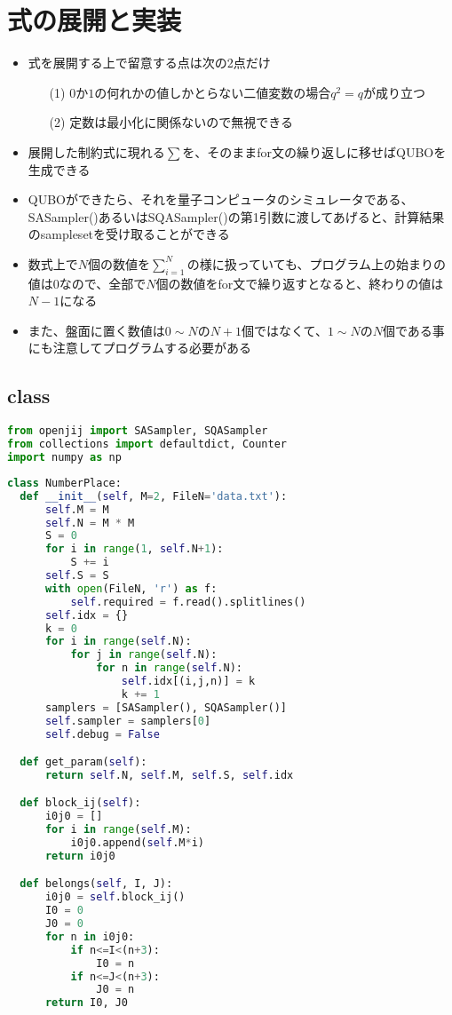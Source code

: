 \documentclass[uplatex,dvipdfmx,a4paper,11pt,oneside,openany]{jsbook}
\begin{document}
\section{式の展開と実装}

\begin{itemize}
\item 式を展開する上で留意する点は次の2点だけ
  \begin{itemize}
  \item[(1)] $0$か$1$の何れかの値しかとらない二値変数の場合$q^2=q$が成り立つ
  \item[(2)] 定数は最小化に関係ないので無視できる
  \end{itemize}
\item 展開した制約式に現れる$\sum$を、そのままfor文の繰り返しに移せばQUBOを生成できる
\item QUBOができたら、それを量子コンピュータのシミュレータである、SASampler()あるいはSQASampler()の第1引数に渡してあげると、計算結果のsamplesetを受け取ることができる
\item 数式上で$N$個の数値を$\sum_{i=1}^N$の様に扱っていても、プログラム上の始まりの値は$0$なので、全部で$N$個の数値をfor文で繰り返すとなると、終わりの値は$N-1$になる
\item また、盤面に置く数値は$0\sim N$の$N+1$個ではなくて、$1\sim N$の$N$個である事にも注意してプログラムする必要がある
\end{itemize}

\subsection{class}

\begin{lstlisting}[language=Python]
from openjij import SASampler, SQASampler
from collections import defaultdict, Counter
import numpy as np
\end{lstlisting}

\begin{lstlisting}[language=Python]
class NumberPlace:
  def __init__(self, M=2, FileN='data.txt'):
      self.M = M
      self.N = M * M
      S = 0
      for i in range(1, self.N+1):
          S += i
      self.S = S
      with open(FileN, 'r') as f:
          self.required = f.read().splitlines()
      self.idx = {}
      k = 0
      for i in range(self.N):
          for j in range(self.N):
              for n in range(self.N):
                  self.idx[(i,j,n)] = k
                  k += 1
      samplers = [SASampler(), SQASampler()]
      self.sampler = samplers[0]
      self.debug = False

  def get_param(self):
      return self.N, self.M, self.S, self.idx

  def block_ij(self):
      i0j0 = []
      for i in range(self.M):
          i0j0.append(self.M*i)
      return i0j0

  def belongs(self, I, J):
      i0j0 = self.block_ij()
      I0 = 0
      J0 = 0
      for n in i0j0:
          if n<=I<(n+3):
              I0 = n
          if n<=J<(n+3):
              J0 = n
      return I0, J0
\end{lstlisting}
\end{document}
